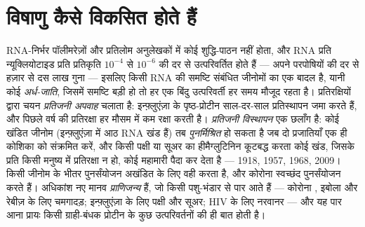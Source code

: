 \section{विषाणु कैसे विकसित होते हैं}

\begin{definition}[उत्परिवर्तन, अर्ध-जाति, अपवाह और विस्थापन]\label{def:b3:virology:evolution}
RNA-निर्भर पॉलीमरेज़ों और प्रतिलोम अनुलेखकों में कोई शुद्धि-पाठन नहीं
होता, और RNA  प्रति न्यूक्लियोटाइड प्रति प्रतिकृति $10^{-4}$ से
$10^{-6}$ की दर से उत्परिवर्तित होते हैं --- अपने परपोषियों की दर से
हज़ार से दस लाख गुना --- इसलिए किसी RNA  की समष्टि संबंधित
जीनोमों का एक बादल है, यानी कोई \emph{अर्ध-जाति}, जिसमें समष्टि बड़ी हो
तो हर एक बिंदु उत्परिवर्ती हर समय मौजूद रहता है। प्रतिरक्षियों द्वारा
चयन \emph{प्रतिजनी अपवाह} चलाता है: इन्फ़्लुएंज़ा के पृष्ठ-प्रोटीन
साल-दर-साल प्रतिस्थापन जमा करते हैं, और पिछले वर्ष की प्रतिरक्षा हर
मौसम में कम रक्षा करती है। \emph{प्रतिजनी विस्थापन} एक छलाँग है: कोई
खंडित जीनोम (इन्फ़्लुएंज़ा में आठ RNA खंड हैं) तब
\emph{पुनर्मिश्रित} हो सकता है जब दो प्रजातियाँ एक ही कोशिका को
संक्रमित करें, और किसी पक्षी या सूअर  का हीमैग्लुटिनिन कूटबद्ध
करता कोई खंड, जिसके प्रति किसी मनुष्य में प्रतिरक्षा न हो, कोई महामारी
पैदा कर देता है --- 1918, 1957, 1968, 2009।
किसी जीनोम के भीतर पुनर्संयोजन अखंडित  के लिए वही करता है,
और कोरोना  स्वच्छंद पुनर्संयोजन करते हैं। अधिकांश नए मानव 
\emph{प्राणिजन्य} हैं, जो किसी पशु-भंडार से पार आते हैं --- कोरोना
, इबोला और रेबीज़ के लिए चमगादड़; इन्फ़्लुएंज़ा के लिए पक्षी और
सूअर; HIV के लिए नरवानर --- और यह पार आना प्रायः किसी ग्राही-बंधक
प्रोटीन के कुछ उत्परिवर्तनों की ही बात होती है।
\end{definition}

